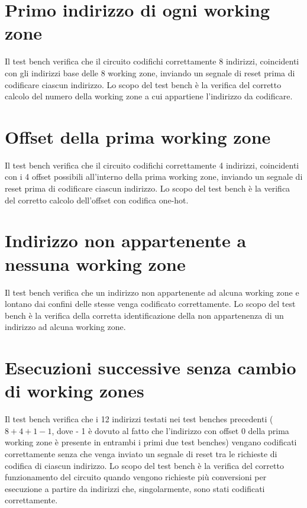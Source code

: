 \documentclass[10pt,english, openany]{book}
\begin{document}
\section{Primo indirizzo di ogni working zone}

Il test bench verifica che il circuito codifichi correttamente 8 indirizzi, coincidenti con gli indirizzi base delle 8 working zone, inviando un segnale di reset prima di codificare ciascun indirizzo. Lo scopo del test bench è la verifica del corretto calcolo del numero della working zone a cui appartiene l’indirizzo da codificare.

\section{Offset della prima working zone}

Il test bench verifica che il circuito codifichi correttamente 4 indirizzi, coincidenti con i 4 offset possibili all’interno della prima working zone, inviando un segnale di reset prima di codificare ciascun indirizzo. Lo scopo del test bench è la verifica del corretto calcolo dell’offset con codifica one-hot.

\section{Indirizzo non appartenente a nessuna working zone}

Il test bench verifica che un indirizzo non appartenente ad alcuna working zone e lontano dai confini delle stesse venga codificato correttamente. Lo scopo del test bench è la verifica della corretta identificazione della non appartenenza di un indirizzo ad alcuna working zone.

\section{Esecuzioni successive senza cambio di working zones}

Il test bench verifica che i 12 indirizzi testati nei test benches precedenti ($8 + 4 + 1 - 1$, dove - 1 è dovuto al fatto che l’indirizzo con offset 0 della prima working zone è presente in entrambi i primi due test benches) vengano codificati correttamente senza che venga inviato un segnale di reset tra le richieste di codifica di ciascun indirizzo. Lo scopo del test bench è la verifica del corretto funzionamento del circuito quando vengono richieste più conversioni per esecuzione a partire da indirizzi che, singolarmente, sono stati codificati correttamente.
\end{document}
